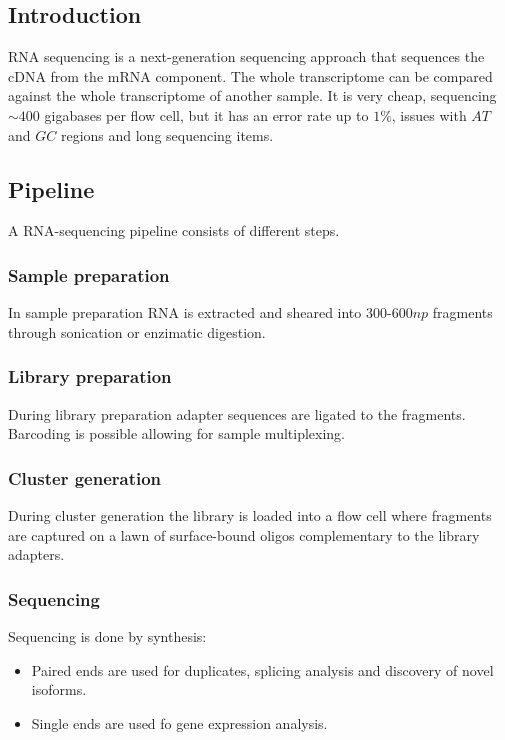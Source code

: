 	\subsection{Introduction}
	RNA sequencing is a next-generation sequencing approach that sequences the cDNA from the mRNA component.
	The whole transcriptome can be compared against the whole transcriptome of another sample.
	It is very cheap, sequencing $\sim 400$ gigabases per flow cell, but it has an error rate up to $1\%$, issues with $AT$ and $GC$ regions and long sequencing items.

	\subsection{Pipeline}
	A RNA-sequencing pipeline consists of different steps.

		\subsubsection{Sample preparation}
		In sample preparation RNA is extracted and sheared into $300$-$600np$ fragments through sonication or enzimatic digestion.

		\subsubsection{Library preparation}
		During library preparation adapter sequences are ligated to the fragments.
		Barcoding is possible allowing for sample multiplexing.

		\subsubsection{Cluster generation}
		During cluster generation the library is loaded into a flow cell where fragments are captured on a lawn of surface-bound oligos complementary to the library adapters.

		\subsubsection{Sequencing}
		Sequencing is done by synthesis:

		\begin{multicols}{2}
			\begin{itemize}
				\item Paired ends are used for duplicates, splicing analysis and discovery of novel isoforms.
				\item Single ends are used fo gene expression analysis.
			\end{itemize}
		\end{multicols}

